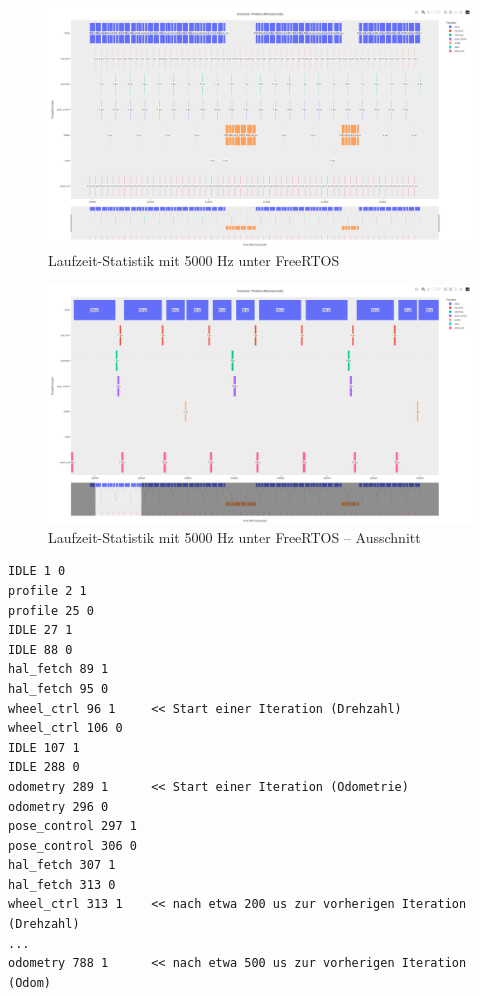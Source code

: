 \begin{figure}[H]
    \centering
    \includegraphics[width=1\textwidth]{assets/freertos_profiling_5000hz}
    \caption{Laufzeit-Statistik mit 5000 Hz unter FreeRTOS}
    \label{fig:freertos_5000hz}
\end{figure}
\begin{figure}[H]
    \centering
    \includegraphics[width=1\textwidth]{assets/freertos_profiling_5000hz_ausschnitt}
    \caption{Laufzeit-Statistik mit 5000 Hz unter FreeRTOS -- Ausschnitt}
    \label{fig:freertos_5000hz_section}
\end{figure}

\begin{code}
\begin{verbatim}
IDLE 1 0
profile 2 1
profile 25 0
IDLE 27 1
IDLE 88 0
hal_fetch 89 1
hal_fetch 95 0
wheel_ctrl 96 1     << Start einer Iteration (Drehzahl)
wheel_ctrl 106 0
IDLE 107 1
IDLE 288 0
odometry 289 1      << Start einer Iteration (Odometrie)
odometry 296 0
pose_control 297 1
pose_control 306 0
hal_fetch 307 1
hal_fetch 313 0
wheel_ctrl 313 1    << nach etwa 200 us zur vorherigen Iteration (Drehzahl)
...
odometry 788 1      << nach etwa 500 us zur vorherigen Iteration (Odom)
\end{verbatim}
    \label{code:freertos_data_5000hz}
\end{code}

